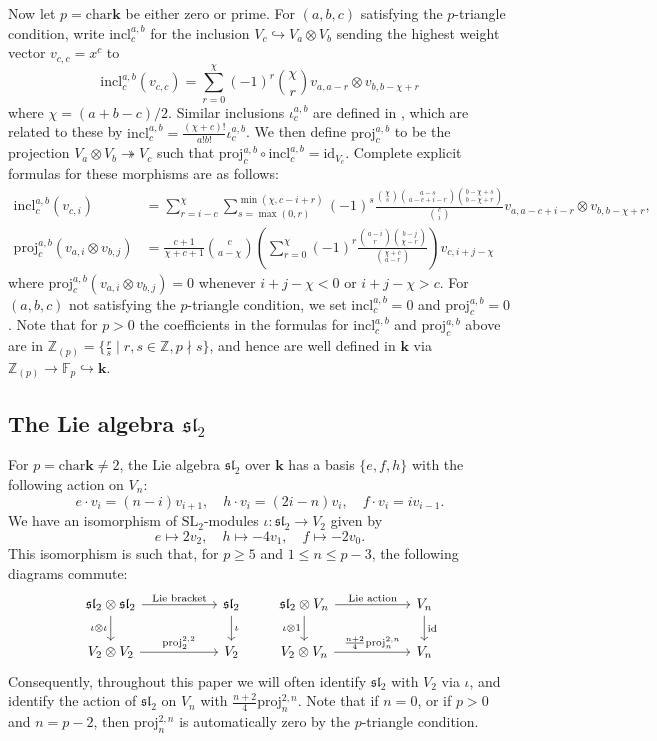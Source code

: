 \documentclass[11pt,a4paper,reqno]{amsart}
\theoremstyle{definition}
\newcommand{\bk}{\mathbf{k}}
\numberwithin{equation}{section}
\newcommand{\charr}{\mathrm{char}}
\newcommand{\mZ}{\mathbb{Z}}
\newcommand{\fsl}{\mathfrak{sl}}
\newcommand{\id}{\mathrm{id}}
\newcommand{\mF}{\mathbb{F}}
\newcommand{\SL}{\mathrm{SL}}
\newcommand{\incl}{\mathrm{incl}}
\newcommand{\proj}{\mathrm{proj}}
\begin{document}
Now let $p=\charr\bk$ be either zero or prime. For $(a,b,c)$ satisfying the $p$-triangle condition, write $\incl^{a,b}_c$ for the inclusion $V_c\hookrightarrow V_a\otimes V_b$ sending the highest weight vector $v_{c,c}=x^c$ to
\[\incl^{a,b}_c(v_{c,c})=\sum_{r=0}^\chi (-1)^r \binom{\chi}{r} v_{a,a-r}\otimes v_{b,b-\chi+r}\]
where $\chi=(a+b-c)/2$. Similar inclusions $\iota^{a,b}_c$ are defined in \cite{sl2comb}, which are related to these by $\incl^{a,b}_c=\frac{(\chi+c)!}{a!b!}\iota^{a,b}_c$. We then define $\proj^{a,b}_c$ to be the projection $V_a\otimes V_b\twoheadrightarrow V_c$ such that $\proj^{a,b}_c\circ\incl^{a,b}_c=\id_{V_c}$. Complete explicit formulas for these morphisms are as follows:
\begin{align*}
\incl^{a,b}_c(v_{c,i})&=\sum_{r=i-c}^{\chi}\sum_{s=\max(0,r)}^{\min(\chi,c-i+r)}(-1)^s\frac{\binom{\chi}{s}\binom{a-s}{a-c+i-r}\binom{b-\chi+s}{b-\chi+r}}{\binom ci}v_{a,a-c+i-r}\otimes v_{b,b-\chi+r},\\
\proj^{a,b}_c(v_{a,i}\otimes v_{b,j})&=\frac{c+1}{\chi+c+1}\binom{c}{a-\chi}\left(\sum_{r=0}^\chi (-1)^r\frac{\binom{a-i}{r}\binom{b-j}{\chi-r}}{\binom{\chi+c}{a-r}}\right)v_{c,i+j-\chi}
\end{align*}
where $\proj_c^{a,b}(v_{a,i}\otimes v_{b,j})=0$ whenever $i+j-\chi<0$ or $i+j-\chi>c$. For $(a,b,c)$ not satisfying the $p$-triangle condition, we set $\incl^{a,b}_c=0$ and $\proj^{a,b}_c=0$. Note that for $p>0$ the coefficients in the formulas for $\incl^{a,b}_c$ and $\proj^{a,b}_c$ above are in $\mZ_{(p)}=\{\frac rs\mid r,s\in\mZ,p\nmid s\}$, and hence are well defined in $\bk$ via $\mZ_{(p)}\to\mF_p\hookrightarrow\bk$.

\subsection{The Lie algebra $\fsl_2$}\label{SecSL2Lie} For $p=\charr\bk\neq2$, the Lie algebra $\fsl_2$ over $\bk$ has a basis $\{e,f,h\}$ with the following action on $V_n$:
\[e\cdot v_i=(n-i)v_{i+1},\quad h\cdot v_i=(2i-n)v_i,\quad f\cdot v_i=iv_{i-1}.\]
We have an isomorphism of $\SL_2$-modules $\iota:\fsl_2\to V_2$ given by
\[e\mapsto2v_2,\quad h\mapsto-4v_1,\quad f\mapsto-2v_0.\]
This isomorphism is such that, for $p\geq5$ and $1\leq n\leq p-3$, the following diagrams commute:
\[\begin{tikzcd}
\fsl_2\otimes\fsl_2 \arrow{r}{\text{Lie bracket}} \arrow[swap]{d}{\iota\otimes\iota} &[3em] \fsl_2 \arrow{d}{\iota}\\
V_2\otimes V_2 \arrow{r}{\proj^{2,2}_2} & V_2
\end{tikzcd}\qquad\begin{tikzcd}
\fsl_2\otimes V_n \arrow{r}{\text{Lie action}} \arrow[swap]{d}{\iota\otimes1} &[3em] V_n \arrow{d}{\id}\\
V_2\otimes V_n \arrow{r}{\frac{n+2}4\proj^{2,n}_n} & V_n
\end{tikzcd}\]
Consequently, throughout this paper we will often identify $\fsl_2$ with $V_2$ via $\iota$, and identify the action of $\fsl_2$ on $V_n$ with $\frac{n+2}4\proj^{2,n}_n$. Note that if $n=0$, or if $p>0$ and $n=p-2$, then $\proj^{2,n}_n$ is automatically zero by the $p$-triangle condition.
\end{document}
